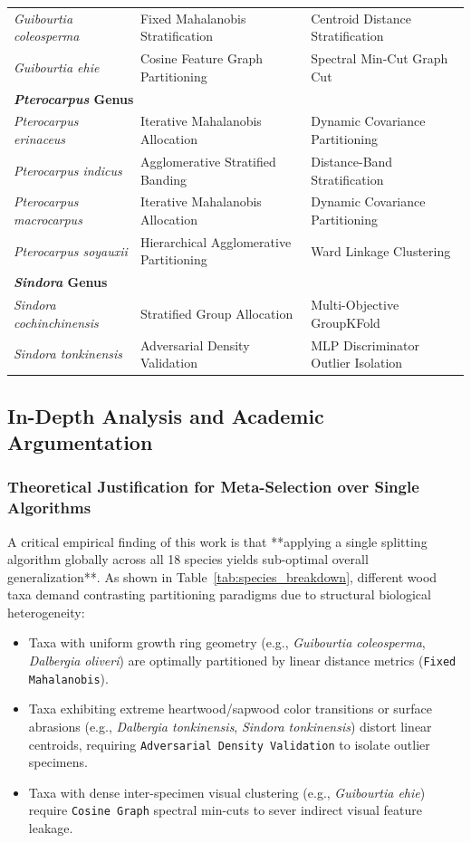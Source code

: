 \begin{table}[htbp]
\begin{tabular}{l l l}
\quad \textit{Guibourtia coleosperma}    & Fixed Mahalanobis Stratification & Centroid Distance Stratification \\
\quad \textit{Guibourtia ehie}           & Cosine Feature Graph Partitioning & Spectral Min-Cut Graph Cut \\
\midrule
\multicolumn{3}{l}{\textbf{\textit{Pterocarpus} Genus}} \\
\quad \textit{Pterocarpus erinaceus}      & Iterative Mahalanobis Allocation & Dynamic Covariance Partitioning \\
\quad \textit{Pterocarpus indicus}        & Agglomerative Stratified Banding & Distance-Band Stratification \\
\quad \textit{Pterocarpus macrocarpus}    & Iterative Mahalanobis Allocation & Dynamic Covariance Partitioning \\
\quad \textit{Pterocarpus soyauxii}       & Hierarchical Agglomerative Partitioning & Ward Linkage Clustering \\
\midrule
\multicolumn{3}{l}{\textbf{\textit{Sindora} Genus}} \\
\quad \textit{Sindora cochinchinensis} & Stratified Group Allocation & Multi-Objective GroupKFold \\
\quad \textit{Sindora tonkinensis}    & Adversarial Density Validation & MLP Discriminator Outlier Isolation \\
\bottomrule
\end{tabular}
\end{table}

\subsection{In-Depth Analysis and Academic Argumentation}

\subsubsection{Theoretical Justification for Meta-Selection over Single Algorithms}
A critical empirical finding of this work is that **applying a single splitting algorithm globally across all 18 species yields sub-optimal overall generalization**. As shown in Table~\ref{tab:species_breakdown}, different wood taxa demand contrasting partitioning paradigms due to structural biological heterogeneity:
\begin{itemize}
\item Taxa with uniform growth ring geometry (e.g., \textit{Guibourtia coleosperma}, \textit{Dalbergia oliveri}) are optimally partitioned by linear distance metrics (\texttt{Fixed Mahalanobis}).
\item Taxa exhibiting extreme heartwood/sapwood color transitions or surface abrasions (e.g., \textit{Dalbergia tonkinensis}, \textit{Sindora tonkinensis}) distort linear centroids, requiring \texttt{Adversarial Density Validation} to isolate outlier specimens.
\item Taxa with dense inter-specimen visual clustering (e.g., \textit{Guibourtia ehie}) require \texttt{Cosine Graph} spectral min-cuts to sever indirect visual feature leakage.
\end{itemize}

